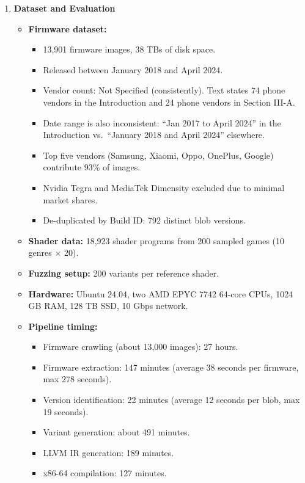 \documentclass[11pt,a4paper]{article}
\newcommand{\entrypart}[1]{\textbf{\color{accent}#1}\par\vspace{2pt}}
\begin{document}
\begin{enumerate}
    \item \entrypart{Dataset and Evaluation}
    \begin{itemize}[leftmargin=*, itemsep=1pt, topsep=2pt]
        \item \textbf{Firmware dataset:}
        \begin{itemize}[itemsep=0pt]
            \item 13,901 firmware images, 38 TBs of disk space.
            \item Released between January 2018 and April 2024.
            \item Vendor count: Not Specified (consistently). Text states 74 phone vendors in the Introduction and 24 phone vendors in Section III-A.
            \item Date range is also inconsistent: ``Jan 2017 to April 2024'' in the Introduction vs.\ ``January 2018 and April 2024'' elsewhere.
            \item Top five vendors (Samsung, Xiaomi, Oppo, OnePlus, Google) contribute 93\% of images.
            \item Nvidia Tegra and MediaTek Dimensity excluded due to minimal market shares.
            \item De-duplicated by Build ID: 792 distinct blob versions.
        \end{itemize}
        \item \textbf{Shader data:} 18,923 shader programs from 200 sampled games (10 genres $\times$ 20).
        \item \textbf{Fuzzing setup:} 200 variants per reference shader.
        \item \textbf{Hardware:} Ubuntu 24.04, two AMD EPYC 7742 64-core CPUs, 1024 GB RAM, 128 TB SSD, 10 Gbps network.
        \item \textbf{Pipeline timing:}
        \begin{itemize}[itemsep=0pt]
            \item Firmware crawling (about 13,000 images): 27 hours.
            \item Firmware extraction: 147 minutes (average 38 seconds per firmware, max 278 seconds).
            \item Version identification: 22 minutes (average 12 seconds per blob, max 19 seconds).
            \item Variant generation: about 491 minutes.
            \item LLVM IR generation: 189 minutes.
            \item x86-64 compilation: 127 minutes.

\end{itemize}
\end{itemize}
\end{enumerate}
\end{document}
